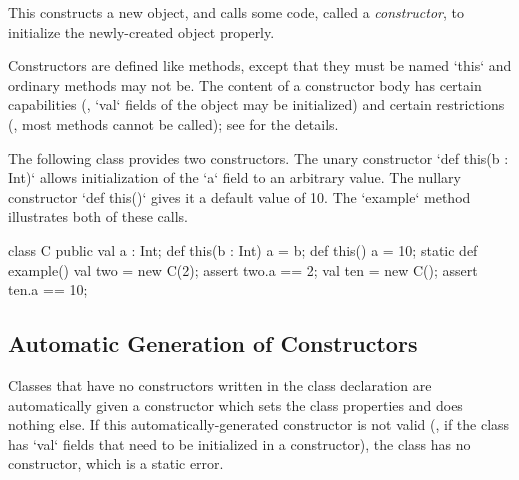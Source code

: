This constructs a new object, and calls some code, called a {\em constructor},
to initialize the newly-created object properly.

Constructors are defined like methods, except that they must be named \xcd`this`
and ordinary methods may not be.    The content of a constructor body has
certain capabilities (\eg, \xcd`val` fields of the object may be initialized)
and certain restrictions (\eg, most methods cannot be called); see
 for the details.

\begin{ex}

The following class provides two constructors.  The unary constructor 
\xcd`def this(b : Int)` allows initialization of the \xcd`a` field to an 
arbitrary value.  The nullary constructor \xcd`def this()` gives it a default
value of 10.  The \xcd`example` method illustrates both of these calls.


\begin{xten}
class C {
  public val a : Int;
  def this(b : Int) { a = b; } 
  def this()        { a = 10; }
  static def example() {
     val two = new C(2);
     assert two.a == 2;
     val ten = new C(); 
     assert ten.a == 10;
  }
}
\end{xten}
\end{ex}

\subsection{Automatic Generation of Constructors}

Classes that have no constructors written in the class declaration are
automatically given a constructor which sets the class properties and does
nothing else. If this automatically-generated constructor is not valid (\eg,
if the class has \xcd`val` fields that need to be initialized in a
constructor), the class has no constructor, which is a static error.

